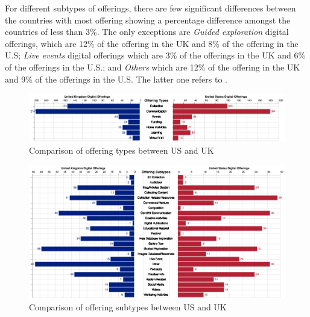 \documentclass{egpubl}
\begin{document}
For different subtypes of offerings, there are few significant differences between the countries with most offering showing a percentage difference amongst the countries of less than 3\%. The only exceptions are \emph{Guided exploration} digital offerings, which are 12\% of the offering in the UK and 8\% of the offering in the U.S; \emph{Live events} digital offerings which are 3\% of the offerings in the UK and 6\% of the offerings in the U.S.; and \emph{Others} which are 12\% of the offering in the UK and 9\% of the offerings in the U.S. The latter one refers to . 
 
\begin{figure}[h]
  \centering
  \includegraphics[width=\linewidth]{images/typecomparison.png}
  \caption{\label{fig:TypeComparisonUKUS}
           Comparison of offering types between US and UK}
\end{figure}
\begin{figure}[h]
  \centering
  \includegraphics[width=\linewidth]{images/subtypecomparison.png}
  \caption{\label{fig:SubTypeComparisonUKUS}
           Comparison of offering subtypes between US and UK}
\end{figure}

 
\end{document}
